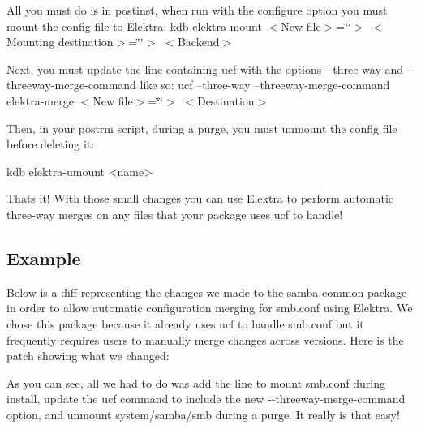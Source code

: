 All you must do is in {\ttfamily postinst}, when run with the {\ttfamily configure} option you must mount the config file to Elektra\+: kdb elektra-\/mount $<$\+New file$>$=\char`\"{}\char`\"{}$>$ $<$\+Mounting destination$>$=\char`\"{}\char`\"{}$>$ $<$\+Backend$>$

Next, you must update the line containing {\ttfamily ucf} with the options {\ttfamily -\/-\/three-\/way} and {\ttfamily -\/-\/threeway-\/merge-\/command} like so\+: ucf --three-\/way --threeway-\/merge-\/command elektra-\/merge $<$\+New file$>$=\char`\"{}\char`\"{}$>$ $<$\+Destination$>$

Then, in your {\ttfamily postrm} script, during a purge, you must unmount the config file before deleting it\+:


\begin{DoxyCode}
kdb elektra-umount <name>
\end{DoxyCode}


That\textquotesingle{}s it! With those small changes you can use Elektra to perform automatic three-\/way merges on any files that your package uses ucf to handle!

\subsection*{Example}

Below is a diff representing the changes we made to the samba-\/common package in order to allow automatic configuration merging for {\ttfamily smb.\+conf} using Elektra. We chose this package because it already uses ucf to handle {\ttfamily smb.\+conf} but it frequently requires users to manually merge changes across versions. Here is the patch showing what we changed\+:




As you can see, all we had to do was add the line to mount {\ttfamily smb.\+conf} during install, update the ucf command to include the new {\ttfamily -\/-\/threeway-\/merge-\/command} option, and unmount {\ttfamily system/samba/smb} during a purge. It really is that easy! 